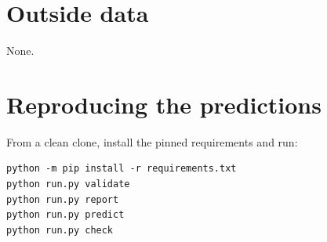 \documentclass[10pt]{article}
\begin{document}
\section*{Outside data}
None.

\section*{Reproducing the predictions}
From a clean clone, install the pinned requirements and run:
\begin{verbatim}
python -m pip install -r requirements.txt
python run.py validate
python run.py report
python run.py predict
python run.py check
\end{verbatim}
\end{document}
